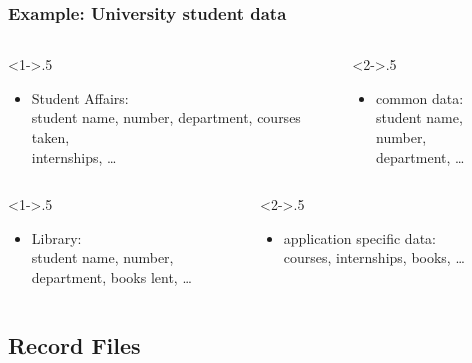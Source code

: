 \documentclass[dvipsnames]{beamer}
\theoremstyle{plain}
\begin{document}
\begin{frame}
  \frametitle{Example: University student data}

  \begin{columns}[t]
    \begin{column}<1->{.5\textwidth}
    \begin{itemize}
      \item Student Affairs:\\
	student name, number,
	department, courses taken,\\
	internships, \ldots
    \end{itemize}
    \end{column}

    \begin{column}<2->{.5\textwidth}
    \begin{itemize}
      \item common data:\\
	student name, number,\\
	department, \ldots
    \end{itemize}
    \end{column}
  \end{columns}

  \begin{columns}[t]
    \begin{column}<1->{.5\textwidth}
      \begin{itemize}
	\item Library:\\
	  student name, number,\\
	  department, books lent, \ldots
      \end{itemize}
    \end{column}

    \begin{column}<2->{.5\textwidth}
      \begin{itemize}
	\item application specific data:\\
	  courses, internships, books, \ldots
      \end{itemize}
    \end{column}
  \end{columns}
\end{frame}

\subsection{Record Files}
\end{document}
